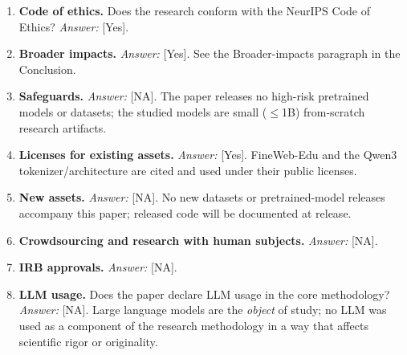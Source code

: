 \documentclass{article}
\begin{document}
\begin{enumerate}
\item \textbf{Code of ethics.} Does the research conform with the NeurIPS Code of Ethics?
\emph{Answer:} [Yes].

\item \textbf{Broader impacts.} \emph{Answer:} [Yes]. See the Broader-impacts paragraph in
the Conclusion.

\item \textbf{Safeguards.} \emph{Answer:} [NA]. The paper releases no high-risk pretrained
models or datasets; the studied models are small ($\le$1B) from-scratch research artifacts.

\item \textbf{Licenses for existing assets.} \emph{Answer:} [Yes]. FineWeb-Edu and the Qwen3
tokenizer/architecture are cited and used under their public licenses.

\item \textbf{New assets.} \emph{Answer:} [NA]. No new datasets or pretrained-model releases
accompany this paper; released code will be documented at release.

\item \textbf{Crowdsourcing and research with human subjects.} \emph{Answer:} [NA].

\item \textbf{IRB approvals.} \emph{Answer:} [NA].

\item \textbf{LLM usage.} Does the paper declare LLM usage in the core methodology?
\emph{Answer:} [NA]. Large language models are the \emph{object} of study; no LLM was used
as a component of the research methodology in a way that affects scientific rigor or
originality.
\end{enumerate}
\fi
\end{document}
